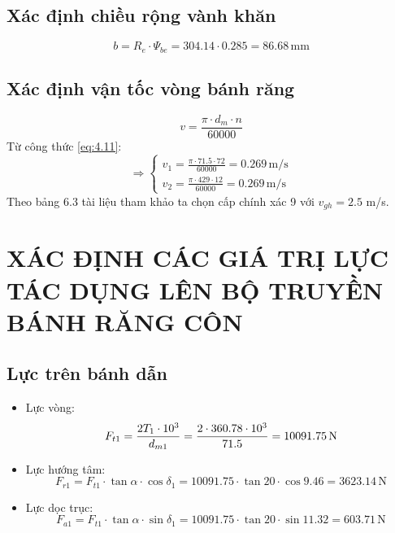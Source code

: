         \subsection{Xác định chiều rộng vành khăn}
            \begin{equation}
                b = R_e \cdot \Psi_{be} = 304.14 \cdot 0.285 = 86.68 \, \mathrm{mm}
                \label{eq:4.10}
            \end{equation}
        \subsection{Xác định vận tốc vòng bánh răng}
            \begin{equation}
                v = \frac{\pi \cdot d_m \cdot n}{60000}
                \label{eq:4.11}
            \end{equation}
            \hspace*{0.6cm}Từ công thức \ref{eq:4.11}:
            \[
            \Rightarrow
            \begin{cases}
                v_1 = \frac{\pi \cdot 71.5 \cdot 72}{60000} = 0.269 \, \mathrm{m/s} \\
                v_2 = \frac{\pi \cdot 429 \cdot 12 }{60000} = 0.269 \, \mathrm{m/s}
            \end{cases}
            \]
            \hspace*{0.6cm}Theo bảng 6.3 tài liệu tham khảo \cite{gtctm} ta chọn cấp chính xác 9 với $v_{gh} = 2.5$ m/s.
    \section{XÁC ĐỊNH CÁC GIÁ TRỊ LỰC TÁC DỤNG LÊN BỘ TRUYỀN BÁNH RĂNG CÔN}
        \subsection{Lực trên bánh dẫn}
            \begin{itemize}
                \item Lực vòng:
                    \begin{equation}
                        F_{t1} = \frac{2T_1 \cdot 10^3}{d_{m1}} = \frac{2 \cdot 360.78 \cdot 10^3}{71.5} = 10091.75 \, \mathrm{N} \\
                        \label{eq:4.12}
                    \end{equation}
                \item Lực hướng tâm:
                    \begin{equation}
                        F_{r1} = F_{t1} \cdot \tan{\alpha} \cdot \cos{\delta_1} = 10091.75 \cdot \tan{20} \cdot \cos{9.46} = 3623.14  \, \mathrm{N}
                        \label{eq:4.13}
                    \end{equation}
                \item Lực dọc trục:
                    \begin{equation}
                        F_{a1} = F_{t1} \cdot \tan{\alpha} \cdot \sin{\delta_1} = 10091.75 \cdot \tan{20} \cdot \sin{11.32} = 603.71 \, \mathrm{N}
                        \label{eq:4.14}
                    \end{equation}
            \end{itemize}
